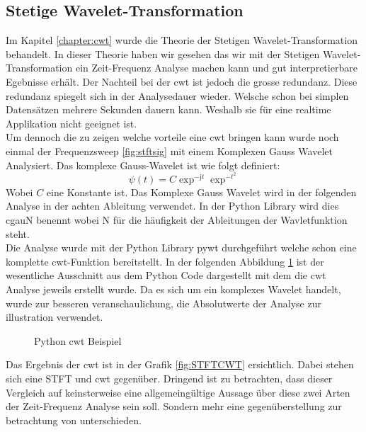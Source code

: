 
\subsection{Stetige Wavelet-Transformation} 
Im Kapitel \ref{chapter:cwt} wurde die Theorie der Stetigen Wavelet-Transformation behandelt. In dieser Theorie haben wir gesehen das wir mit der Stetigen Wavelet-Transformation ein Zeit-Frequenz Analyse machen kann und gut interpretierbare Egebnisse erhält. Der Nachteil bei der cwt ist jedoch die grosse redundanz. Diese redundanz spiegelt sich in der Analysedauer wieder. Welsche schon bei simplen Datensätzen mehrere Sekunden dauern kann. Weshalb sie für eine realtime Applikation nicht geeignet ist.\\
Um dennoch die zu zeigen welche vorteile eine cwt bringen kann wurde noch einmal der Frequenzsweep \ref{fig:stftsig} mit einem Komplexen Gauss Wavelet Analysiert. Das komplexe Gauss-Wavelet ist wie folgt definiert:
\begin{equation}
\psi(t)=C \exp ^{-\mathrm{j} t} \exp ^{-t^{2}}
\end{equation}
Wobei $C$ eine Konstante ist. Das Komplexe Gauss Wavelet wird in der folgenden Analyse in der achten Ableitung verwendet. In der Python Library wird dies cgauN benennt wobei N für die häufigkeit der Ableitungen der Wavletfunktion steht.\\

Die Analyse wurde mit der Python Library pywt durchgeführt welche schon eine komplette cwt-Funktion bereitstellt. In der folgenden Abbildung \ref{fig:python-cwt} ist der wesentliche Ausschnitt aus dem Python Code dargestellt mit dem die cwt Analyse jeweils erstellt wurde. Da es sich um ein komplexes Wavelet handelt, wurde zur besseren veranschaulichung, die Absolutwerte der Analyse zur illustration verwendet.\\

\begin{figure}
	\centering
	
	\caption{Python cwt Beispiel}
	\label{fig:python-cwt}
\end{figure}

Das Ergebnis der cwt ist in der Grafik \ref{fig:STFTCWT} ersichtlich. Dabei stehen sich eine STFT und cwt gegenüber. Dringend ist zu betrachten, dass dieser Vergleich auf keinsterweise eine allgemeingültige Aussage über diese zwei Arten der Zeit-Frequenz Analyse sein soll. Sondern mehr eine gegenüberstellung zur betrachtung von unterschieden. 


